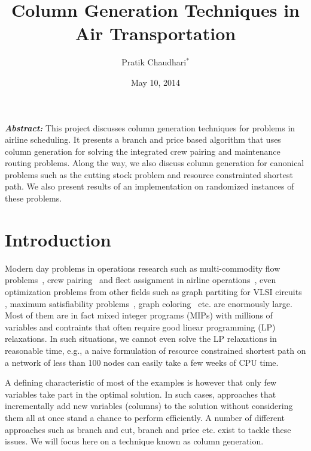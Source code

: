 \documentclass[letterpaper, 10pt, twocolumn, reqno]{amsart}
\title{Column Generation Techniques in Air Transportation}
\author{Pratik Chaudhari$^*$}
\date{May 10, 2014}
\begin{document}
\maketitle

{
\small
\textbf{\emph{Abstract:}}
This project discusses column generation techniques for problems in airline scheduling. It presents a branch and price based algorithm that uses column generation for solving the integrated crew pairing and maintenance routing problems. Along the way, we also discuss column generation for canonical problems such as the cutting stock problem and resource constrainted shortest path. We also present results of an implementation on randomized instances of these problems.
}

\section{Introduction}
\label{sec:intro}


Modern day problems in operations research such as multi-commodity flow problems~\cite{barnhart2000using}, crew pairing~\cite{anbil1998column} and fleet assignment in
airline operations~\cite{barnhart1998flight}, even optimization problems from other fields such as graph partiting for VLSI circuits \cite{vanderbeck1994thesis}, maximum satisfiability problems~\cite{hansen1998mixed}, graph coloring~\cite{mehrotra1996column} etc. are enormously large.
Most of them are in fact mixed integer programs (MIPs) with millions of variables and contraints that often require good linear programming (LP)
relaxations. In such situations, we cannot even solve the LP relaxations in reasonable time, e.g., a naive formulation of resource constrained shortest
path on a network of less than 100 nodes can easily take a few weeks of CPU time.

A defining characteristic of most of the examples is however that only few variables take part in the optimal solution. In such cases, approaches that incrementally add new variables (columns) to the solution without considering them all at once stand a chance to perform efficiently. A number of different approaches such as branch and cut, branch and price etc. exist to tackle these issues. We will focus here on a technique known as column generation.
\end{document}
